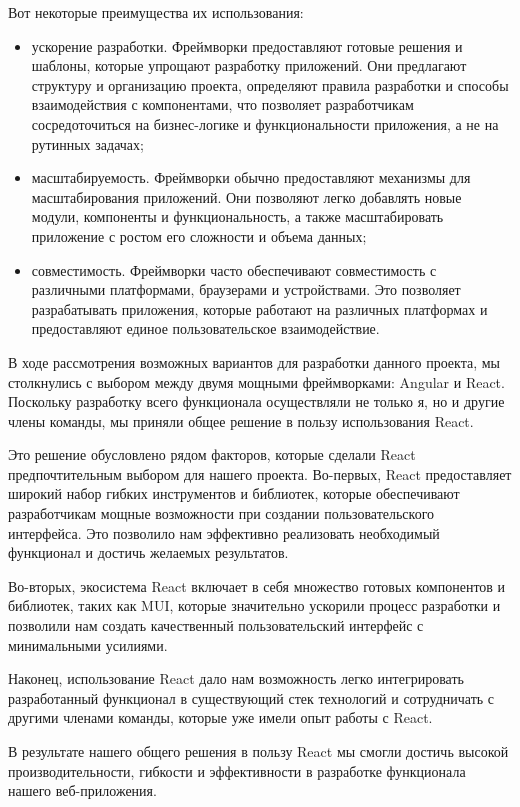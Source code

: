 Вот некоторые преимущества их использования:

\begin{itemize}
    \item ускорение разработки. Фреймворки предоставляют готовые решения и шаблоны, которые упрощают разработку приложений. Они предлагают структуру и организацию проекта, определяют правила разработки и способы взаимодействия с компонентами, что позволяет разработчикам сосредоточиться на бизнес-логике и функциональности приложения, а не на рутинных задачах;
    \item масштабируемость. Фреймворки обычно предоставляют механизмы для масштабирования приложений. Они позволяют легко добавлять новые модули, компоненты и функциональность, а также масштабировать приложение с ростом его сложности и объема данных;
    \item совместимость. Фреймворки часто обеспечивают совместимость с различными платформами, браузерами и устройствами. Это позволяет разрабатывать приложения, которые работают на различных платформах и предоставляют единое пользовательское взаимодействие.
\end{itemize}

В ходе рассмотрения возможных вариантов для разработки данного проекта, мы столкнулись с выбором между двумя мощными фреймворками: Angular и React. Поскольку разработку всего функционала осуществляли не только я, но и другие члены команды, мы приняли общее решение в пользу использования React.

Это решение обусловлено рядом факторов, которые сделали React предпочтительным выбором для нашего проекта. Во-первых, React предоставляет широкий набор гибких инструментов и библиотек, которые обеспечивают разработчикам мощные возможности при создании пользовательского интерфейса. Это позволило нам эффективно реализовать необходимый функционал и достичь желаемых результатов.

Во-вторых, экосистема React включает в себя множество готовых компонентов и библиотек, таких как MUI, которые значительно ускорили процесс разработки и позволили нам создать качественный пользовательский интерфейс с минимальными усилиями.

Наконец, использование React дало нам возможность легко интегрировать разработанный функционал в существующий стек технологий и сотрудничать с другими членами команды, которые уже имели опыт работы с React.

В результате нашего общего решения в пользу React мы смогли достичь высокой производительности, гибкости и эффективности в разработке функционала нашего веб-приложения.











